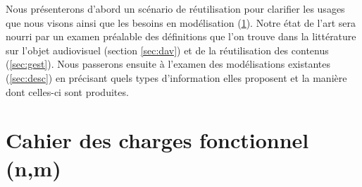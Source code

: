 Nous présenterons d'abord un scénario de réutilisation pour clarifier les usages que nous visons ainsi que les besoins en modélisation (\ref{sec:cdc-av}).
Notre état de l'art sera nourri par un examen préalable des définitions que l'on trouve dans la littérature sur l'objet audiovisuel (section \ref{sec:dav}) et de la réutilisation des contenus (\ref{sec:gest}).
Nous passerons ensuite à l'examen des modélisations existantes (\ref{sec:desc}) en précisant quels types d'information elles proposent et la manière dont celles-ci sont produites. 






\section{Cahier des charges fonctionnel (n,m)}\label{sec:cdc-av}

